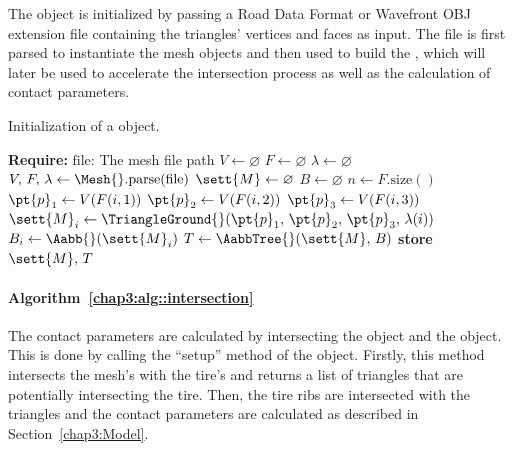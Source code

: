 The \Mesh{} object is initialized by passing a Road Data Format or Wavefront OBJ extension file containing the triangles' vertices and faces as input. The file is first parsed to instantiate the mesh \TriangleGround{} objects and then used to build the \AabbTree{}, which will later be used to accelerate the intersection process as well as the calculation of contact parameters.

\begin{breakablealgorithm}
  \caption{Initialization of a \Mesh{} object.}
  \label{chap3:alg::mesh}
  \begin{algorithmic}[1]
    \State \textbf{Require:} $\text{file}$: The mesh file path
     
      \State $V \gets \varnothing$ 
      \State $F \gets \varnothing$ 
      \State $\lambda \gets \varnothing$ 
      \State $V, \, F, \, \lambda \gets \Mesh{}.\text{parse}(\text{file})$ 
      \State $\sett{M} \gets \varnothing$ 
      \State $B \gets \varnothing$ 
      \State $n \gets F.\text{size}()$ 
        \State $\pt{p}_1 \gets V(F(i,1))$ 
        \State $\pt{p}_2 \gets V(F(i,2))$ 
        \State $\pt{p}_3 \gets V(F(i,3))$ 
        \State $\sett{M}_i \gets \TriangleGround{}(\pt{p}_1, \, \pt{p}_2, \, \pt{p}_3, \, \lambda(i))$ %
        \State $B_i \gets \Aabb{}(\sett{M}_i)$ 
      \EndFor
      \State $T \gets \AabbTree{}(\sett{M}, \, B)$ 
      \State \textbf{store} $\sett{M}, \, T$ 
    \EndFunction
  \end{algorithmic}
\end{breakablealgorithm}

\paragraph*{Algorithm~\ref{chap3:alg::intersection}}

The contact parameters are calculated by intersecting the \Shell{} object and the \Mesh{} object. This is done by calling the ``setup'' method of the \Shell{} object. Firstly, this method intersects the mesh's \AabbTree{} with the tire's \Aabb{} and returns a list of triangles that are potentially intersecting the tire. Then, the tire ribs are intersected with the triangles and the contact parameters are calculated as described in Section~\ref{chap3:Model}.

